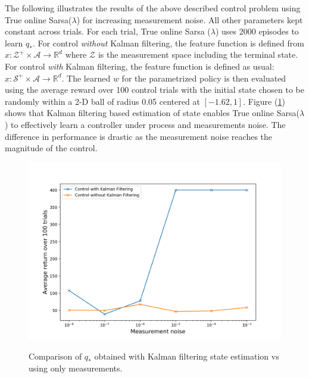 \documentclass{article}
\begin{document}
The following illustrates the results of the above described control problem using True online Sarsa($\lambda$) for increasing measurement noise. All other parameters kept constant across trials. For each trial, True online Sarsa ($\lambda$) uses 2000 episodes to learn $q_*$. For control \textit{without} Kalman filtering, the feature function is defined from $x : \mathcal{Z}^+ \times \mathcal A \rightarrow \mathbb{R}^d$ where $\mathcal{Z}$ is the measurement space including the terminal state. For control \textit{with} Kalman filtering, the feature function is defined as usual: $x : \mathcal{S}^+ \times \mathcal A \rightarrow \mathbb{R}^d$. The learned $w$ for the parametrized policy is then evaluated using the average reward over 100 control trials with the initial state chosen to be randomly within a 2-D ball of radius 0.05 centered at $[-1.62, 1]$. Figure (\ref{fig:kf_control}) shows that Kalman filtering based estimation of state enables True online Sarsa($\lambda$) to effectively learn a controller under process and measurements noise. The difference in performance is drastic as the measurement noise reaches the magnitude of the control.

\begin{figure}[H]
\includegraphics[scale=0.5]{2d_res.png}
\label{fig:kf_control}
\caption{Comparison of $q_*$ obtained with Kalman filtering state estimation vs using only measurements.}
\end{figure}



 

\end{document}
